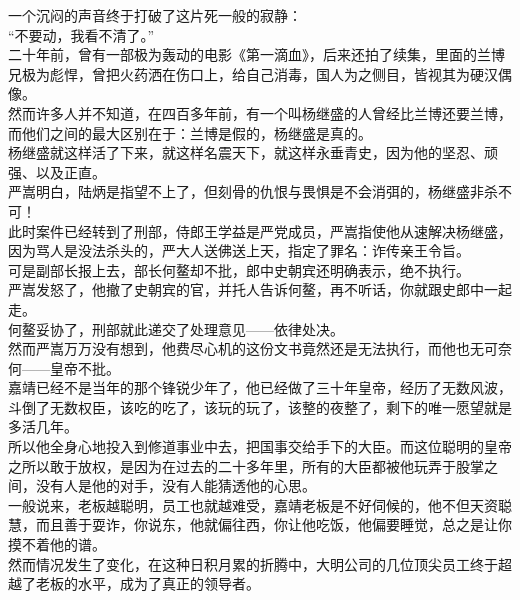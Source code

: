 \begin{multicols}{\theparacolNo}
一个沉闷的声音终于打破了这片死一般的寂静：\\

“不要动，我看不清了。”\\

二十年前，曾有一部极为轰动的电影《第一滴血》，后来还拍了续集，里面的兰博兄极为彪悍，曾把火药洒在伤口上，给自己消毒，国人为之侧目，皆视其为硬汉偶像。\\

然而许多人并不知道，在四百多年前，有一个叫杨继盛的人曾经比兰博还要兰博，而他们之间的最大区别在于：兰博是假的，杨继盛是真的。\\

杨继盛就这样活了下来，就这样名震天下，就这样永垂青史，因为他的坚忍、顽强、以及正直。\\

严嵩明白，陆炳是指望不上了，但刻骨的仇恨与畏惧是不会消弭的，杨继盛非杀不可！\\

此时案件已经转到了刑部，侍郎王学益是严党成员，严嵩指使他从速解决杨继盛，因为骂人是没法杀头的，严大人送佛送上天，指定了罪名：诈传亲王令旨。\\

可是副部长报上去，部长何鳌却不批，郎中史朝宾还明确表示，绝不执行。\\

严嵩发怒了，他撤了史朝宾的官，并托人告诉何鳌，再不听话，你就跟史郎中一起走。\\

何鳌妥协了，刑部就此递交了处理意见——依律处决。\\

然而严嵩万万没有想到，他费尽心机的这份文书竟然还是无法执行，而他也无可奈何——皇帝不批。\\

嘉靖已经不是当年的那个锋锐少年了，他已经做了三十年皇帝，经历了无数风波，斗倒了无数权臣，该吃的吃了，该玩的玩了，该整的夜整了，剩下的唯一愿望就是多活几年。\\

所以他全身心地投入到修道事业中去，把国事交给手下的大臣。而这位聪明的皇帝之所以敢于放权，是因为在过去的二十多年里，所有的大臣都被他玩弄于股掌之间，没有人是他的对手，没有人能猜透他的心思。\\

一般说来，老板越聪明，员工也就越难受，嘉靖老板是不好伺候的，他不但天资聪慧，而且善于耍诈，你说东，他就偏往西，你让他吃饭，他偏要睡觉，总之是让你摸不着他的谱。\\

然而情况发生了变化，在这种日积月累的折腾中，大明公司的几位顶尖员工终于超越了老板的水平，成为了真正的领导者。\\


\end{multicols}
